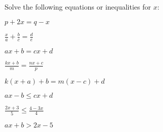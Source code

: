 \documentclass[10pt]{exam}
\begin{document}
Solve the following equations or inequalities for \(x\):

\begin{questions}
\begin{multicols}{2}

\question
\(p + 2x = q - x\)

\vspace{1in}

\question
\(\displaystyle \frac{x}{a} + \frac{b}{c} = \frac{d}{e}\)

\vspace{1.5in}

\question
\(ax + b = cx + d\)

\vspace{1.5in}

\question
\(\displaystyle \frac{kx + b}{m} = \frac{nx + c}{p}\)

\vspace{2in}

\question
\(k(x + a) + b = m(x - c) + d\)

\vspace{2in}

\question
\(ax - b \leq cx + d\)

\vspace{2in}

\question
\(\displaystyle \frac{2x + 3}{5} \leq \frac{4 - 3x}{4}\)

\vspace{2in}

\question
\(ax + b > 2x - 5\)

\vspace{2in}

\end{multicols}
\end{questions}

\newpage
\end{document}
